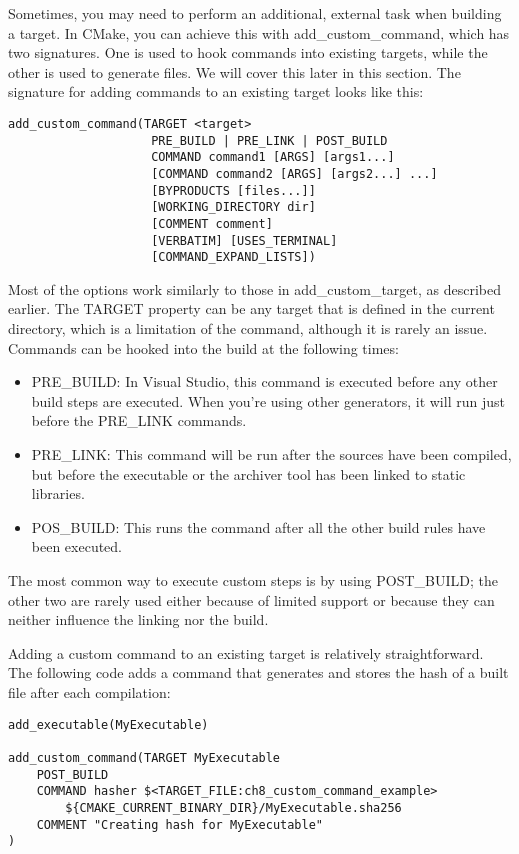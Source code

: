 Sometimes, you may need to perform an additional, external task when building a target. In CMake, you can achieve this with add\_custom\_command, which has two signatures. One is used to hook commands into existing targets, while the other is used to generate files. We will cover this later in this section. The signature for adding commands to an existing target looks like this:

\begin{lstlisting}[style=styleCMake]
add_custom_command(TARGET <target>
					PRE_BUILD | PRE_LINK | POST_BUILD
					COMMAND command1 [ARGS] [args1...]
					[COMMAND command2 [ARGS] [args2...] ...]
					[BYPRODUCTS [files...]]
					[WORKING_DIRECTORY dir]
					[COMMENT comment]
					[VERBATIM] [USES_TERMINAL]
					[COMMAND_EXPAND_LISTS])
\end{lstlisting}

Most of the options work similarly to those in add\_custom\_target, as described earlier. The TARGET property can be any target that is defined in the current directory, which is a limitation of the command, although it is rarely an issue. Commands can be hooked into the build at the following times:

\begin{itemize}
\item 
PRE\_BUILD: In Visual Studio, this command is executed before any other build steps are executed. When you're using other generators, it will run just before the PRE\_LINK commands.

\item 
PRE\_LINK: This command will be run after the sources have been compiled, but before the executable or the archiver tool has been linked to static libraries.

\item 
POS\_BUILD: This runs the command after all the other build rules have been executed.
\end{itemize}

The most common way to execute custom steps is by using POST\_BUILD; the other two are rarely used either because of limited support or because they can neither influence the linking nor the build.

Adding a custom command to an existing target is relatively straightforward. The following code adds a command that generates and stores the hash of a built file after each compilation:

\begin{lstlisting}[style=styleCMake]
add_executable(MyExecutable)

add_custom_command(TARGET MyExecutable
	POST_BUILD
	COMMAND hasher $<TARGET_FILE:ch8_custom_command_example>
		${CMAKE_CURRENT_BINARY_DIR}/MyExecutable.sha256
	COMMENT "Creating hash for MyExecutable"
)
\end{lstlisting}

